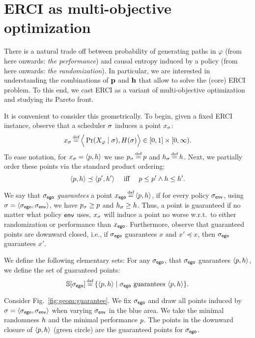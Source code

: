 \section{ERCI as multi-objective optimization}\label{sec:convex}
There is a natural trade off
between probability of generating paths in $\varphi$ (from here
onwards: \emph{the performance}) and causal entropy induced by a
policy (from here onwards: \emph{the randomization}).  In particular,
we are interested in understanding the combinations of $\mathbf{p}$
and $\mathbf{h}$ that allow to solve the (core) ERCI problem. To this
end, we cast ERCI as a variant of multi-objective optimization and
studying its Pareto front.

It is convenient to consider this geometrically.
To begin, given a fixed ERCI instance, observe that a scheduler $\sigma$
induces a point $x_\sigma$:
\begin{equation}
  x_\sched \eqdef \Big\langle \Pr(X_\varphi \mid \sched), H(\sched) \Big\rangle \in [0,1] \times [0,\infty).  
\end{equation}
To ease notation, for $x_\sigma = \langle p,h \rangle$ we use
$\scp_\sched \eqdef \scp$ and $\rndp_\sched \eqdef \rndp$. Next, we
partially order these points via the standard product ordering:
\begin{equation}
  \langle p,h \rangle \preceq \langle p',h' \rangle \quad\text{ iff }\quad p \leq p' \wedge h \leq h'.
\end{equation}


We say that ${\sigma_{\mathsf{ego}}}$ \emph{guarantees} a point $x_\pOne \eqdef
\langle \scp, \rndp \rangle$, if for every policy ${\sigma_{\mathsf{env}}}$, using
$\sigma = \langle {\sigma_{\mathsf{ego}}}, {\sigma_{\mathsf{env}}} \rangle$, we have
$p_\sigma \geq p$ and $h_\sigma \geq h$. Thus, a point
is guaranteed if no matter what policy $\mathsf{env}$ uses, $x_\sigma$ will
induce a point no worse w.r.t.\ to either randomization or performance
than $x_{\mathsf{ego}}$. Furthermore, observe that guaranteed points are
downward closed, i.e., if ${\sigma_{\mathsf{ego}}}$ guarantees $x$ and $x' \preceq x$,
then ${\sigma_{\mathsf{ego}}}$ guarantees $x'$.


We define the following elementary sets: For any ${\sigma_{\mathsf{ego}}}$,
that ${\sigma_{\mathsf{ego}}}$ guarantees $\langle p, h \rangle$, we define
the set of guaranteed points:
\begin{equation}\label{eq:guaranteed}
  \solutions[\pOneSched] \eqdef \{ \langle \scp, \rndp \rangle \mid  \pOneSched \text{ guarantees } \langle \scp, \rndp \rangle \}.
\end{equation}
\begin{example}
Consider Fig.~\ref{fig:geom:guarantee}. We fix ${\sigma_{\mathsf{ego}}}$ and draw all points induced by $\sigma = \langle {\sigma_{\mathsf{ego}}}, {\sigma_{\mathsf{env}}} \rangle$ when varying ${\sigma_{\mathsf{env}}}$ in the blue area. We take the minimal randomness $h$ and the minimal performance $p$. The points in the downward closure of $\langle p, h \rangle$ (green circle) are the guaranteed points for ${\sigma_{\mathsf{ego}}}$.	
\end{example}

